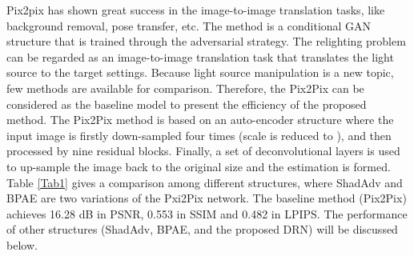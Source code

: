 \documentclass[runningheads]{llncs}
\begin{document}
Pix2pix \cite{pix2pix} has shown great success in the image-to-image translation tasks, like background removal, pose transfer, etc. The method is a conditional GAN structure that is trained through the adversarial strategy. The relighting problem can be regarded as an image-to-image translation task that translates the light source to the target settings. Because light source manipulation is a new topic, few methods are available for comparison.  Therefore, the Pix2Pix can be considered as the baseline model to present the efficiency of the proposed method. The Pix2Pix method is based on an auto-encoder structure where the input image is firstly down-sampled four times (scale is reduced to ), and then processed by nine residual blocks. Finally, a set of deconvolutional layers is used to up-sample the image back to the original size and the estimation is formed. Table \ref{Tab1} gives a comparison among different structures, where ShadAdv and BPAE are two variations of the Pxi2Pix network. The baseline method (Pix2Pix) achieves 16.28 dB in PSNR, 0.553 in SSIM and 0.482 in LPIPS. The performance of other structures (ShadAdv, BPAE, and the proposed DRN) will be discussed below.

\baselineskip 
\begin{table}
\caption{Comparison among different structures}
\baselineskip 
\label{Tab1}
\begin{center}
\begin{small}
\end{small}
\end{center}
\baselineskip 
\end{table}
\end{document}
